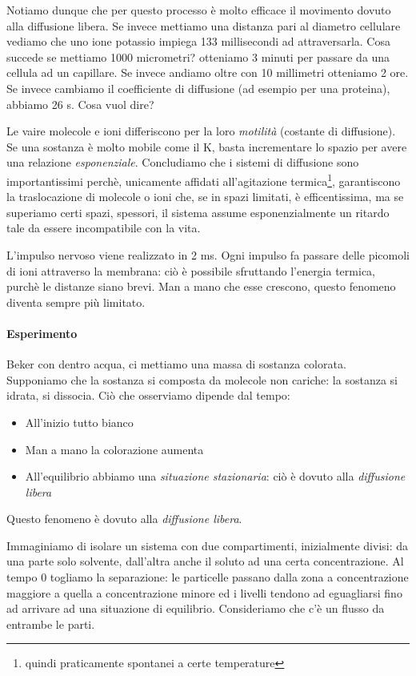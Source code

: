 \documentclass[a4paper,12pt]{article}
\begin{document}
Notiamo dunque che per questo processo è molto efficace il movimento dovuto alla diffusione libera.
Se invece mettiamo una distanza pari al diametro cellulare vediamo che uno ione potassio impiega 133 millisecondi ad attraversarla.
Cosa succede se mettiamo 1000 micrometri? otteniamo 3 minuti per passare da una cellula ad un capillare. Se invece andiamo oltre con 10 millimetri otteniamo 2 ore.
Se invece cambiamo il coefficiente di diffusione (ad esempio per una proteina), abbiamo 26 s. Cosa vuol dire?

Le vaire molecole e ioni differiscono per la loro \emph{motilità} (costante di diffusione). Se una sostanza è molto mobile come il K, basta incrementare lo spazio per avere una relazione \emph{esponenziale}.
Concludiamo che i sistemi di diffusione sono importantissimi perchè, unicamente affidati all'agitazione termica\footnote{quindi praticamente spontanei a certe temperature}, garantiscono la traslocazione di molecole o ioni che, se in spazi limitati, è efficentissima, ma se superiamo certi spazi, spessori, il sistema assume esponenzialmente un ritardo tale da essere incompatibile con la vita. 


L'impulso nervoso viene realizzato in 2 ms. Ogni impulso fa passare delle picomoli di ioni attraverso la membrana: ciò è possibile sfruttando l'energia termica, purchè le distanze siano brevi. Man a mano che esse crescono, questo fenomeno diventa sempre più limitato.

\paragraph{Esperimento}
Beker con dentro acqua, ci mettiamo una massa di sostanza colorata. Supponiamo che la sostanza si composta da molecole non cariche: la sostanza si idrata, si dissocia. Ciò che osserviamo dipende dal tempo:
\begin{itemize}
\item{All'inizio tutto bianco}
\item{Man a mano la colorazione aumenta}
\item{All'equilibrio abbiamo una \emph{situazione stazionaria}: ciò è dovuto alla \emph{diffusione libera}}
\end{itemize}

Questo fenomeno è dovuto alla \emph{diffusione libera}.


Immaginiamo di isolare un sistema con due compartimenti, inizialmente divisi: da una parte solo solvente, dall'altra anche il soluto ad una certa concentrazione. Al tempo 0 togliamo la separazione: le particelle passano dalla zona a concentrazione maggiore a quella a concentrazione minore ed i livelli tendono ad eguagliarsi fino ad arrivare ad una situazione di equilibrio.
Consideriamo che c'è un flusso da entrambe le parti.
\end{document}
